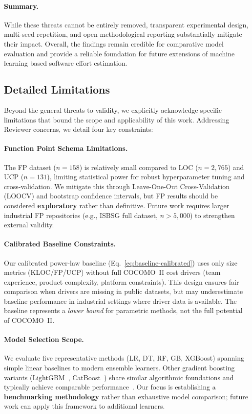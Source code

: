 \documentclass{ieeeaccess}
\begin{document}
\paragraph{Summary.}
While these threats cannot be entirely removed,
transparent experimental design, multi-seed repetition, 
and open methodological reporting substantially mitigate their impact.  
Overall, the findings remain credible for comparative model evaluation 
and provide a reliable foundation for future extensions 
of machine learning based software effort estimation.

\subsection{Detailed Limitations}
\label{sec:limitations}

Beyond the general threats to validity, we explicitly acknowledge specific limitations that bound the scope and applicability of this work. Addressing Reviewer concerns, we detail four key constraints:

\paragraph{Function Point Schema Limitations.}
The FP dataset ($n{=}158$) is relatively small compared to LOC ($n{=}2{,}765$) and UCP ($n{=}131$), limiting statistical power for robust hyperparameter tuning and cross-validation. We mitigate this through Leave-One-Out Cross-Validation (LOOCV) and bootstrap confidence intervals, but FP results should be considered \textbf{exploratory} rather than definitive. Future work requires larger industrial FP repositories (e.g., ISBSG full dataset, $n{>}5{,}000$) to strengthen external validity.

\paragraph{Calibrated Baseline Constraints.}
Our calibrated power-law baseline (Eq.~\ref{eq:baseline-calibrated}) uses only size metrics (KLOC/FP/UCP) without full COCOMO~II cost drivers (team experience, product complexity, platform constraints). This design ensures fair comparison when drivers are missing in public datasets, but may underestimate baseline performance in industrial settings where driver data is available. The baseline represents a \textit{lower bound} for parametric methods, not the full potential of COCOMO~II.

\paragraph{Model Selection Scope.}
We evaluate five representative methods (LR, DT, RF, GB, XGBoost) spanning simple linear baselines to modern ensemble learners. Other gradient boosting variants (LightGBM~\cite{ke2017lightgbm}, CatBoost~\cite{prokhorenkova2018catboost}) share similar algorithmic foundations and typically achieve comparable performance~\cite{prokhorenkova2018catboost}. Our focus is establishing a \textbf{benchmarking methodology} rather than exhaustive model comparison; future work can apply this framework to additional learners.
\end{document}
